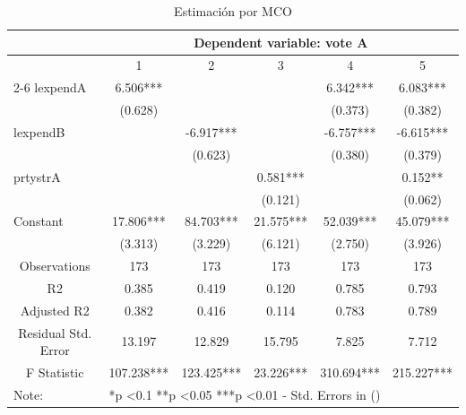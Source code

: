 \documentclass[10pt,a4paper]{article}
\begin{document}
\begin{table}[ht] \centering    \caption{\label{tab:two}Estimación por MCO} \label{Resultados MCO} \begin{tabular}{lccccc} \hline \hline                                         & \multicolumn{5}{c}{Dependent variable: vote A}                                     \\ \hline                                         & 1               & 2              & 3             & 4              & 5              \\ \cline{2-6}  lexpendA                                & 6.506***        &                &               & 6.342***       & 6.083***       \\                                         & (0.628)         &                &               & (0.373)        & (0.382)        \\ lexpendB                                &                 & -6.917***      &               & -6.757***      & -6.615***      \\                                         &                 & (0.623)        &               & (0.380)        & (0.379)        \\ prtystrA                                &                 &                & 0.581***      &                & 0.152**        \\                                         &                 &                & (0.121)       &                & (0.062)        \\ Constant                                & 17.806***       & 84.703***      & 21.575***     & 52.039***      & 45.079***      \\                                         & (3.313)         & (3.229)        & (6.121)       & (2.750)        & (3.926)        \\ \hline \multicolumn{1}{c}{Observations}        & 173             & 173            & 173           & 173            & 173            \\ \multicolumn{1}{c}{R2}                  & 0.385           & 0.419          & 0.120         & 0.785          & 0.793          \\ \multicolumn{1}{c}{Adjusted R2}         & 0.382           & 0.416          & 0.114         & 0.783          & 0.789          \\ \multicolumn{1}{c}{Residual Std. Error} & 13.197          & 12.829         & 15.795        & 7.825          & 7.712          \\ \multicolumn{1}{c}{F Statistic}         & 107.238***      & 123.425***     & 23.226***     & 310.694***     & 215.227***     \\ \hline Note:                                   & \multicolumn{5}{l}{*p \textless 0.1     **p \textless 0.05    ***p \textless 0.01    -  Std. Errors in () } \end{tabular} \end{table}
\end{document}
